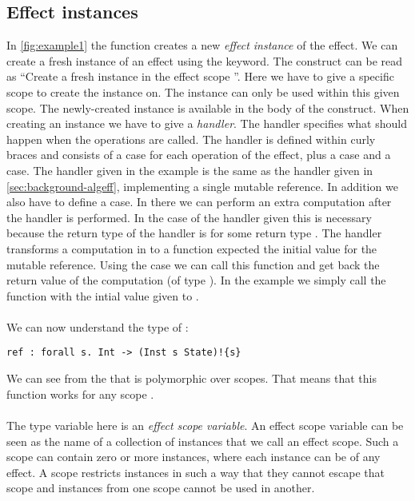 \subsection{Effect instances}
In \cref{fig:example1} the function  creates a new \emph{effect instance} of the  effect.
We can create a fresh instance of an effect using the  keyword.
The construct  can be read as ``Create a fresh  instance in the effect scope ''.
Here we have to give a specific scope  to create the instance on.
The instance can only be used within this given scope.
The newly-created instance is available in the body of the  construct.
When creating an instance we have to give a \emph{handler}.
The handler specifies what should happen when the operations are called.
The handler is defined within curly braces and consists of a case for each operation of the effect, plus a  case and a  case.
The handler given in the example is the same as the handler given in \cref{sec:background-algeff}, implementing a single mutable reference.
In addition we also have to define a  case.
In there we can perform an extra computation after the handler is performed.
In the case of the handler given this is necessary because the return type of the handler is  for some return type .
The handler transforms a computation in to a function expected the initial value for the mutable reference.
Using the  case we can call this function and get back the return value of the computation (of type ).
In the example we simply call the function  with the intial value  given to .
\\\\
We can now understand the type of :
\begin{verbatim}
ref : forall s. Int -> (Inst s State)!{s}
\end{verbatim}
We can see from the  that  is polymorphic over scopes.
That means that this function works for any scope .
\\\\
The type variable  here is an \emph{effect scope variable}.
An effect scope variable can be seen as the name of a collection of instances that we call an effect scope.
Such a scope can contain zero or more instances, where each instance can be of any effect.
A scope restricts instances in such a way that they cannot escape that scope and instances from one scope cannot be used in another.
